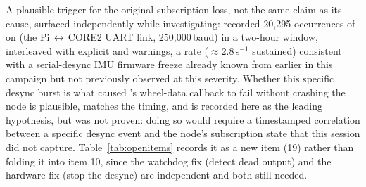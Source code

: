 A plausible trigger for the original subscription loss, not the same claim
as its cause, surfaced independently while investigating:  recorded 20{,}295 occurrences of  on  (the Pi\,$\leftrightarrow$\,CORE2 UART link,
250{,}000\,baud) in a two-hour window, interleaved with explicit
 and  warnings, a rate
($\approx$2.8\,s$^{-1}$ sustained) consistent with a serial-desync IMU
firmware freeze already known from earlier in this campaign but not
previously observed at this severity. Whether this specific desync burst is what caused
's wheel-data callback to fail without
crashing the node is plausible, matches the timing, and is recorded here as
the leading hypothesis, but was not proven: doing so would require a
timestamped correlation between a specific desync event and the node's
subscription state that this session did not capture. Table~\ref{tab:openitems}
records it as a new item (19) rather than folding it into item 10, since the
watchdog fix (detect dead output) and the hardware fix (stop the desync)
are independent and both still needed.

